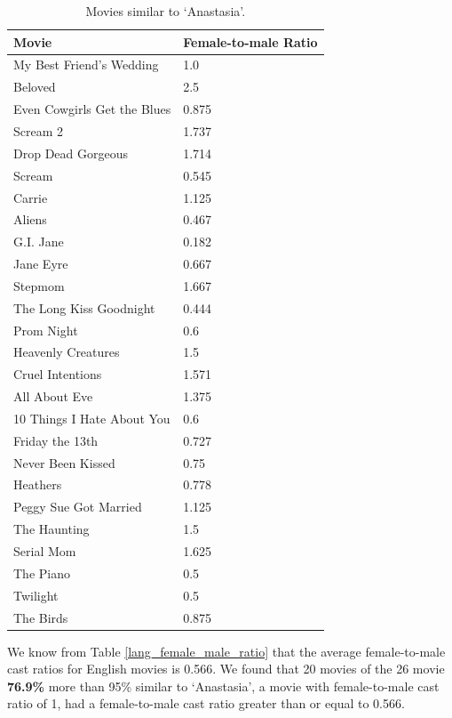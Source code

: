 \documentclass[12pt]{article}
\begin{document}
\begin{table}[H]
\begin{center}
\begin{tabu} to 0.8\textwidth { | X[c] | X[c] | }
\hline
\textbf{Movie} & \textbf{Female-to-male Ratio} \\ \hline
My Best Friend's Wedding & 1.0 \\
Beloved & 2.5 \\
Even Cowgirls Get the Blues & 0.875 \\
Scream 2 & 1.737 \\
Drop Dead Gorgeous & 1.714 \\
Scream & 0.545 \\
Carrie & 1.125 \\
Aliens & 0.467 \\
G.I. Jane & 0.182 \\
Jane Eyre & 0.667 \\
Stepmom & 1.667 \\
The Long Kiss Goodnight & 0.444 \\
Prom Night & 0.6 \\
Heavenly Creatures & 1.5 \\
Cruel Intentions & 1.571 \\
All About Eve & 1.375 \\
10 Things I Hate About You & 0.6 \\
Friday the 13th & 0.727 \\
Never Been Kissed & 0.75 \\
Heathers & 0.778 \\
Peggy Sue Got Married & 1.125 \\
The Haunting & 1.5 \\
Serial Mom & 1.625 \\
The Piano & 0.5 \\
Twilight & 0.5 \\
The Birds & 0.875 \\ \hline
\end{tabu}
\end{center}
\caption{Movies similar to `Anastasia'.}
\label{similar_movies}
\end{table}

We know from Table \ref{lang_female_male_ratio} that the average female-to-male cast ratios for English movies is 0.566. We found that 20 movies of the 26 movie \textbf{76.9\%} more than 95\% similar to `Anastasia', a movie with female-to-male cast ratio of 1, had a female-to-male cast ratio greater than or equal to 0.566.
\end{document}
